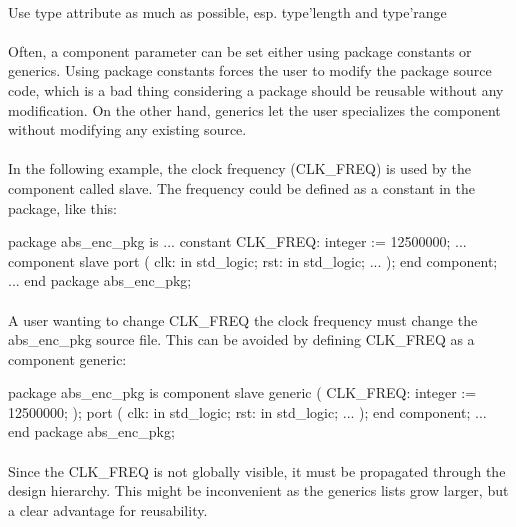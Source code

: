 \documentclass[12pt]{article}
\begin{document}
\paragraph{}
Use type attribute as much as possible, esp. type'length
and type'range


\paragraph{}
Often, a component parameter can be set either using package constants
or generics. Using package constants forces the user to modify the package
source code, which is a bad thing considering a package should be reusable
without any modification. On the other hand, generics let the user specializes
the component without modifying any existing source.

\paragraph{}
In the following example, the clock frequency (CLK\_FREQ) is used by the
component called slave. The frequency could be defined as a constant in the
package, like this:
\begin{vhdl}
package abs_enc_pkg is
...
constant CLK_FREQ: integer := 12500000;
...
component slave
port
(
 clk: in std_logic;
 rst: in std_logic;
 ...
);
end component;
...
end package abs_enc_pkg;
\end{vhdl}

\paragraph{}
A user wanting to change CLK\_FREQ the clock frequency must change the
abs\_enc\_pkg source file. This can be avoided by defining CLK\_FREQ as
a component generic:
\pagebreak
\begin{vhdl}
package abs_enc_pkg is
component slave
generic
(
 CLK_FREQ: integer := 12500000;
);
port
(
 clk: in std_logic;
 rst: in std_logic;
 ...
);
end component;
...
end package abs_enc_pkg;
\end{vhdl}

\paragraph{}
Since the CLK\_FREQ is not globally visible, it must be propagated
through the design hierarchy. This might be inconvenient as the generics
lists grow larger, but a clear advantage for reusability.
\end{document}
